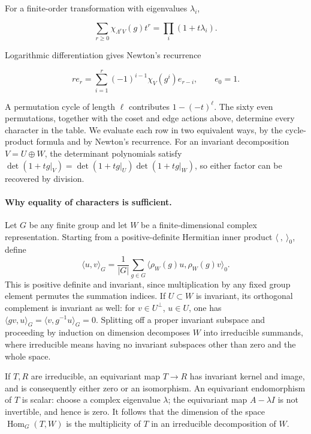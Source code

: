 \documentclass[11pt,a4paper]{article}
\begin{document}
For a finite-order transformation with eigenvalues \(\lambda_i\),

\[
\sum_{r\geq0}\chi_{\Lambda^rV}(g)t^r=\prod_i(1+t\lambda_i).
\]

Logarithmic differentiation gives Newton's recurrence

\[
r e_r=\sum_{i=1}^r(-1)^{i-1}\chi_V(g^i)e_{r-i},\qquad e_0=1.
\]

A permutation cycle of length \(\ell\) contributes \(1-(-t)^\ell\). The sixty even permutations, together with the coset and edge actions above, determine every character in the table. We evaluate each row in two equivalent ways, by the cycle-product formula and by Newton's recurrence. For an invariant decomposition \(V=U\oplus W\), the determinant polynomials satisfy \(\det(1+tg|_V)=\det(1+tg|_U)\det(1+tg|_W)\), so either factor can be recovered by division.

\paragraph{Why equality of characters is sufficient.}
Let \(G\) be any finite group and let \(W\) be a finite-dimensional complex representation. Starting from a positive-definite Hermitian inner product \(\langle\ ,\ \rangle_0\), define
\[
\langle u,v\rangle_G=\frac1{|G|}\sum_{g\in G}
       \langle\rho_W(g)u,\rho_W(g)v\rangle_0.
\]
This is positive definite and invariant, since multiplication by any fixed group element permutes the summation indices. If \(U\subset W\) is invariant, its orthogonal complement is invariant as well: for \(v\in U^\perp\), \(u\in U\), one has \(\langle gv,u\rangle_G=\langle v,g^{-1}u\rangle_G=0\). Splitting off a proper invariant subspace and proceeding by induction on dimension decomposes \(W\) into irreducible summands, where irreducible means having no invariant subspaces other than zero and the whole space.

If \(T,R\) are irreducible, an equivariant map \(T\to R\) has invariant kernel and image, and is consequently either zero or an isomorphism. An equivariant endomorphism of \(T\) is scalar: choose a complex eigenvalue \(\lambda\); the equivariant map \(A-\lambda I\) is not invertible, and hence is zero. It follows that the dimension of the space \(\operatorname{Hom}_G(T,W)\) is the multiplicity of \(T\) in an irreducible decomposition of \(W\).
\end{document}
